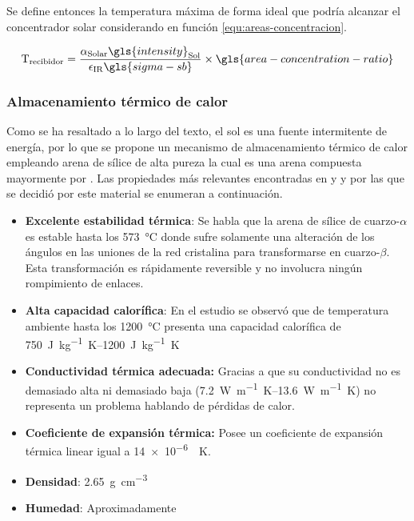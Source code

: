 				
				Se define entonces la temperatura máxima de forma ideal que podría alcanzar el concentrador solar considerando en función \cref{equ:areas-concentracion}.
				
				\begin{equation}
					\text{T}_{\text{recibidor}} = \dfrac{\alpha_{\text{Solar}} \gls{intensity}_{\text{Sol}}}{\epsilon_{\text{IR}} \gls{sigma-sb}} \times \gls{area-concentration-ratio}
				\end{equation}
				
				
				
				
			\subsubsection{Almacenamiento térmico de calor}
				
				Como se ha resaltado a lo largo del texto, el sol es una fuente intermitente de energía, por lo que se propone un mecanismo de almacenamiento térmico de calor empleando arena de sílice de alta pureza la cual es una arena compuesta mayormente por . Las propiedades más relevantes encontradas en \cite{davenport_thermal_2022} y \cite{wypych_2_2021} y por las que se decidió por este material se enumeran a continuación.
				
				\begin{itemize}
					\item \textbf{Excelente estabilidad térmica}: Se habla que la arena de sílice de cuarzo-$\alpha$ es estable hasta los \qty{573}{\degreeCelsius} donde sufre solamente una alteración de los ángulos en las uniones de la red cristalina para transformarse en cuarzo-$\beta$. Esta transformación es rápidamente reversible y no involucra ningún rompimiento de enlaces.
					\item \textbf{Alta capacidad calorífica}: En el estudio se observó que de temperatura ambiente hasta los \qty{1200}{\degreeCelsius} presenta una capacidad calorífica de \qtyrange{750}{1200}{\joule\per\kg\kelvin}
					\item \textbf{Conductividad térmica adecuada:} Gracias a que su conductividad no es demasiado alta ni demasiado baja (\qtyrange{7.2}{13.6}{\watt\per\m\kelvin}) no representa un problema hablando de pérdidas de calor.
					\item \textbf{Coeficiente de expansión térmica:} Posee un coeficiente de expansión térmica linear igual a \qty{14e-6}{\per\kelvin}.
					\item \textbf{Densidad}: \qty{2.65}{\g\per\cm\tothe{3}}
					\item \textbf{Humedad}: Aproximadamente 
				\end{itemize}
				
